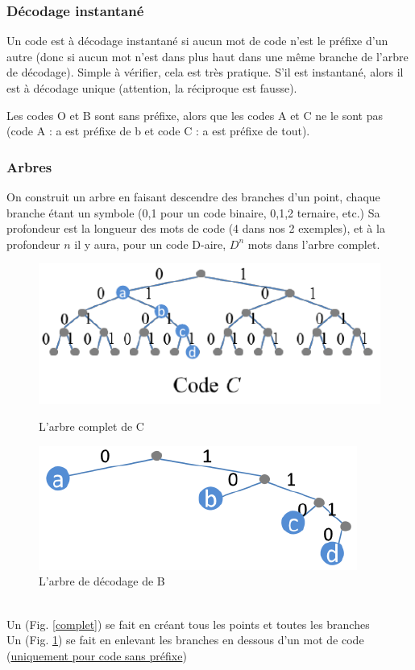 \documentclass[11pt,a4paper]{article}
\renewcommand{\)}{\right)}
\renewcommand{\(}{\left(}
\begin{document}
\subsubsection{Décodage instantané}
Un code est à décodage instantané si aucun mot de code n'est le préfixe d'un autre (donc si aucun mot n'est dans plus haut dans une même branche de l'arbre de décodage). Simple à vérifier, cela est très pratique. S'il est instantané, alors il est à décodage unique (attention, la réciproque est fausse).
\begin{exemple}
	Les codes O et B sont sans préfixe, alors que les codes A et C ne le sont pas (code A : a est préfixe de b et code C : a est préfixe de tout).
\end{exemple}
\subsubsection{Arbres}
On  construit un arbre en faisant descendre des branches d'un point, chaque branche étant un symbole (0,1 pour un code binaire, 0,1,2 ternaire, etc.) Sa profondeur est la longueur des mots de code (4 dans nos 2 exemples), et à la profondeur $n$ il y aura, pour un code D-aire, $D^n$ mots dans l'arbre complet. 
\begin{figure}[!h]
	\begin{minipage}[c]{0.46\linewidth}
		\centering
		\includegraphics[scale=0.65]{images/arbre_complet}
		\caption{L'arbre complet de C}
		\label{complet}
	\end{minipage}
	\begin{minipage}[c]{0.46\linewidth}
		\centering
		\includegraphics[scale=0.75]{images/arbre_decodage}
		\caption{L'arbre de décodage de B}
		\label{decodage}
	\end{minipage}
\end{figure}\\
Un  (Fig. \ref{complet}) se fait en créant tous les points et toutes les branches\\
Un  (Fig. \ref{decodage}) se fait en enlevant les branches en dessous d'un mot de code (\uline{uniquement pour code sans préfixe})
\end{document}
